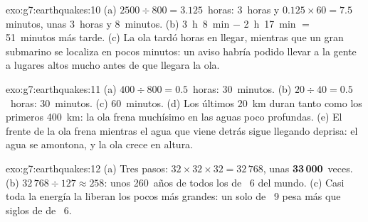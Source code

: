 \begin{solution}{exo:g7:earthquakes:10}
(a) $2500 \div 800 = 3.125$~horas: 3~horas y $0.125 \times 60 = 7.5$
minutos, unas 3~horas y 8~minutos. (b) 3~h~8~min $-$ 2~h~17~min $=$
51~minutos más tarde. (c) La ola tardó horas en llegar, mientras que un
gran  submarino se localiza en pocos minutos: un aviso habría
podido llevar a la gente a lugares altos mucho antes de que llegara la ola.
\end{solution}

\begin{solution}{exo:g7:earthquakes:11}
(a) $400 \div 800 = 0.5$~horas: 30~minutos. (b) $20 \div 40 = 0.5$~horas:
30~minutos. (c) 60~minutos. (d) Los últimos \qty{20}{km} duran tanto como
los primeros \qty{400}{km}: la ola frena muchísimo en las aguas poco
profundas. (e) El frente de la ola frena mientras el agua que viene detrás
sigue llegando deprisa: el agua se amontona, y la ola crece en altura.
\end{solution}

\begin{solution}{exo:g7:earthquakes:12}
(a) Tres pasos: $32 \times 32 \times 32 = 32\,768$, unas
\textbf{33\,000}~veces. (b) $32\,768 \div 127 \approx 258$: unos
260~años de todos los  de ~6 del mundo. (c) Casi toda la
energía la liberan los pocos  más grandes: un solo  de
~9 pesa más que siglos de  de ~6.
\end{solution}

